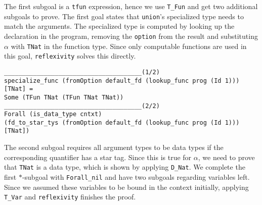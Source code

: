\documentclass[fleqn]{scrreprt}
\newcommand{\coqinline}[1]{\texttt{#1}}
\begin{document}
The first subgoal is a \coqinline{tfun} expression, hence we use \coqinline{T_Fun} and get two additional subgoals to prove. The first goal states that \texttt{union}'s specialized type needs to match the arguments. The specialized type is computed by looking up the declaration in the program, removing the \coqinline{option} from the result and substituting $\alpha$ with \coqinline{TNat} in the function type. Since only computable functions are used in this goal, \coqinline{reflexivity} solves this directly.
\begin{verbatim}
______________________________________(1/2)
specialize_func (fromOption default_fd (lookup_func prog (Id 1))) [TNat] =
Some (TFun TNat (TFun TNat TNat))
______________________________________(2/2)
Forall (is_data_type cntxt)
(fd_to_star_tys (fromOption default_fd (lookup_func prog (Id 1))) [TNat])
\end{verbatim}
The second subgoal requires all argument types to be data types if the corresponding quantifier has a star tag. Since this is true for $\alpha$, we need to prove that \coqinline{TNat} is a data type, which is shown by applying \coqinline{D_Nat}. We complete the first $*$-subgoal with \coqinline{Forall_nil} and have two subgoals regarding variables left. Since we assumed these variables to be bound in the context initially, applying \coqinline{T_Var} and \coqinline{reflexivity} finishes the proof.
\end{document}
